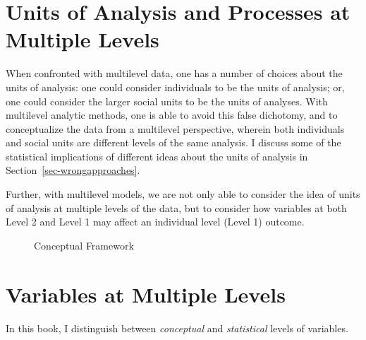 \documentclass[
  letterpaper,
  DIV=11,
  numbers=noendperiod]{scrreprt}
\begin{document}
\section{Units of Analysis and Processes at Multiple
Levels}\label{units-of-analysis-and-processes-at-multiple-levels}

When confronted with multilevel data, one has a number of choices about
the units of analysis: one could consider individuals to be the units of
analysis; or, one could consider the larger social units to be the units
of analyses. With multilevel analytic methods, one is able to avoid this
false dichotomy, and to conceptualize the data from a multilevel
perspective, wherein both individuals and social units are different
levels of the same analysis. I discuss some of the statistical
implications of different ideas about the units of analysis in
Section~\ref{sec-wrongapproaches}. 

Further, with multilevel models, we are not only able to consider the
idea of units of analysis at multiple levels of the data, but to
consider how variables at both Level 2 and Level 1 may affect an
individual level (Level 1) outcome.

\begin{figure}


\caption{\label{fig-conceptual}Conceptual Framework}

\end{figure}%

\section{Variables at Multiple Levels}\label{sec-levels}

In this book, I distinguish between \emph{conceptual} and
\emph{statistical} levels of variables.
\end{document}

